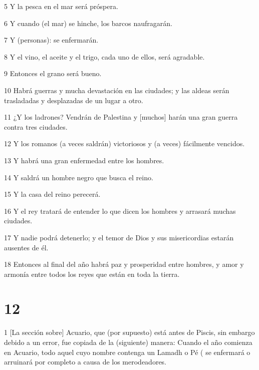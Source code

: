 \par 5 Y la pesca en el mar será próspera.

\par 6 Y cuando (el mar) se hinche, los barcos naufragarán.

\par 7 Y (personas): se enfermarán.

\par 8 Y el vino, el aceite y el trigo, cada uno de ellos, será agradable.

\par 9 Entonces el grano será bueno.

\par 10 Habrá guerras y mucha devastación en las ciudades; y las aldeas serán trasladadas y desplazadas de un lugar a otro.

\par 11 ¿Y los ladrones? Vendrán de Palestina y [muchos] harán una gran guerra contra tres ciudades.

\par 12 Y los romanos (a veces saldrán) victoriosos y (a veces) fácilmente vencidos.

\par 13 Y habrá una gran enfermedad entre los hombres.

\par 14 Y saldrá un hombre negro que busca el reino.

\par 15 Y la casa del reino perecerá.

\par 16 Y el rey tratará de entender lo que dicen los hombres y arrasará muchas ciudades.

\par 17 Y nadie podrá detenerlo; y el temor de Dios y sus misericordias estarán ausentes de él.

\par 18 Entonces al final del año habrá paz y prosperidad entre
hombres, y amor y armonía entre todos los reyes que están en toda la tierra.

\chapter{12}

\par 1 [La sección sobre] Acuario, que (por supuesto) está antes de Piscis, sin embargo debido a un error, fue copiada de la (siguiente) manera: Cuando el año comienza en Acuario, todo aquel cuyo nombre contenga un Lamadh o Pé ( se enfermará o arruinará por completo a causa de los merodeadores.

